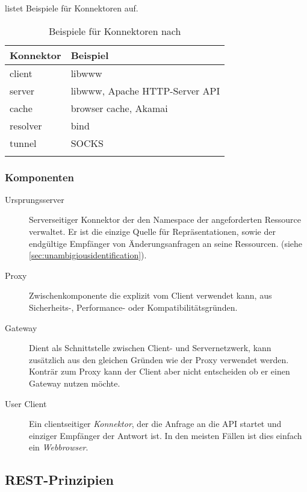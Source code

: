  listet Beispiele für Konnektoren auf.

\begin{table}[tb]
    \begin{longtable}[c]{l l}
        \toprule
        \rowcolor{lightgray}
        \textbf{Konnektor}   & \textbf{Beispiel}\\
        \midrule
        client      & libwww\\
        server      & libwww, Apache HTTP-Server API\\
        cache       & browser cache, Akamai\\
        resolver    & bind\\
        tunnel      & SOCKS\\
        \bottomrule
        \caption{Beispiele für Konnektoren nach \cite{fieldingDissertation}}
        \label{tab:RESTconnectors}
    \end{longtable}
\end{table}       

\subsubsection{Komponenten}
\label{sec:RESTcomponents}

\begin{description}
    \item[Ursprungsserver] 
        Serverseitiger Konnektor der den Namespace der angeforderten Ressource verwaltet. Er ist die einzige Quelle für Repräsentationen, sowie der endgültige Empfänger von Änderungsanfragen an seine Ressourcen. (siehe \cref{sec:unambigiousidentification}).
    \item[Proxy] Zwischenkomponente die explizit vom Client verwendet kann, aus Sicherheits-, Performance- oder Kompatibilitätsgründen.
    \item[Gateway] Dient als Schnittstelle zwischen Client- und Servernetzwerk, kann zusätzlich aus den gleichen Gründen wie der Proxy verwendet werden. Konträr zum Proxy kann der Client aber nicht entscheiden ob er einen Gateway nutzen möchte.
    \item[User Client] 
        Ein clientseitiger \emph{Konnektor}, der die Anfrage an die API startet und einziger Empfänger der Antwort ist. In den meisten Fällen ist dies einfach ein \emph{Webbrowser}.
\end{description}

\subsection{REST-Prinzipien}

